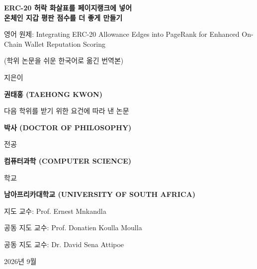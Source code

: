 \begin{titlepage}
\centering
\vspace*{0.4cm}
{\Large\bfseries ERC-20 허락 화살표를 페이지랭크에 넣어\\온체인 지갑 평판 점수를 더 좋게 만들기\par}
\vspace{0.5cm}
{\small 영어 원제: Integrating ERC-20 Allowance Edges into PageRank for Enhanced On-Chain Wallet Reputation Scoring\par}
\vspace{0.3cm}
{\small (학위 논문을 쉬운 한국어로 옮긴 번역본)\par}
\vfill
{지은이\par}
\vspace{0.7cm}
{\large\bfseries 권태홍 (TAEHONG KWON)\par}
\vfill
{다음 학위를 받기 위한 요건에 따라 낸 논문\par}
\vspace{0.7cm}
{\large\bfseries 박사 (DOCTOR OF PHILOSOPHY)\par}
\vspace{0.35cm}
{전공\par}
\vspace{0.7cm}
{\large\bfseries 컴퓨터과학 (COMPUTER SCIENCE)\par}
\vfill
{학교\par}
\vspace{0.7cm}
{\large\bfseries 남아프리카대학교 (UNIVERSITY OF SOUTH AFRICA)\par}
\vfill
{지도 교수: Prof. Ernest Mnkandla\par}
\vspace{0.35cm}
{공동 지도 교수: Prof. Donatien Koulla Moulla\par}
\vspace{0.35cm}
{공동 지도 교수: Dr. David Sena Attipoe\par}
\vfill
{2026년 9월\par}
\end{titlepage}
\restoregeometry
